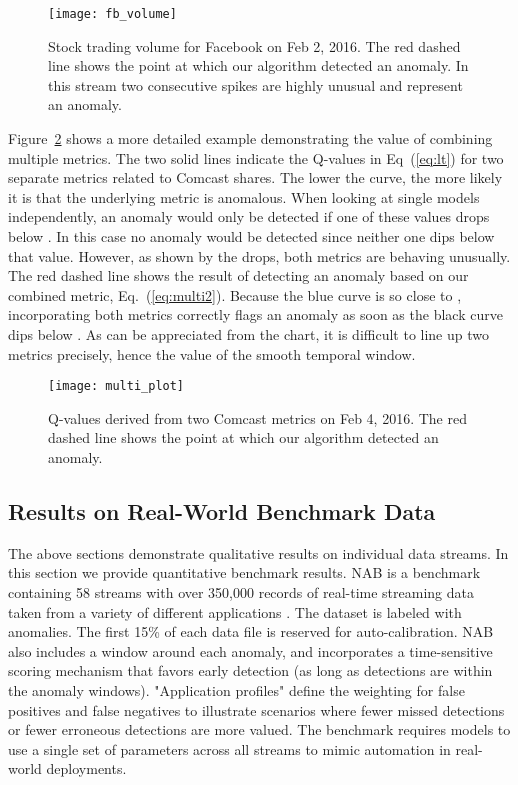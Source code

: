 \documentclass{article}
\begin{document}
\begin{figure}[ht]
\vskip 0.1in
\begin{center}
\centerline{\texttt{[image: fb\_volume]}}
\caption{Stock trading volume for Facebook on Feb 2, 2016. The red dashed line
shows the point at which our algorithm detected an anomaly. In this stream
two consecutive spikes are highly unusual and represent an anomaly.}
\label{fb_volume}
\end{center}
\vskip -0.1in
\end{figure}

Figure~\ref{multi_plot} shows a more detailed example demonstrating the value of
combining multiple metrics.  The two solid lines indicate the Q-values in
Eq~(\ref{eq:lt}) for two separate metrics related to Comcast shares. The lower
the curve, the more likely it is that the underlying metric is anomalous. When
looking at single models independently, an anomaly would only be detected if one
of these values drops below . In this case no anomaly
would be detected since neither one dips below that value. However, as shown by
the drops, both metrics are behaving unusually. The red dashed line shows the
result of detecting an anomaly based on our combined metric,
Eq.~(\ref{eq:multi2}). Because the blue curve is so close to ,
incorporating both metrics correctly flags an anomaly as soon as the black curve
dips below . As can be appreciated from the chart, it is difficult to
line up two metrics precisely, hence the value of the smooth temporal window.

\begin{figure}[ht]
\vskip 0.1in
\begin{center}
\centerline{\texttt{[image: multi\_plot]}}
\caption{Q-values derived from two Comcast metrics on Feb 4, 2016. The red
dashed line shows the point at which our algorithm detected an anomaly.}
\label{multi_plot}
\end{center}
\vskip -0.1in
\end{figure}

\subsection{Results on Real-World Benchmark Data}

The above sections demonstrate qualitative results on individual data streams.
In this section we provide quantitative benchmark results. NAB is a benchmark
containing 58 streams with over 350,000 records of real-time streaming data
taken from a variety of different applications \cite{Lavin2015}. The dataset is
labeled with anomalies. The first 15\% of each data file is reserved for
auto-calibration. NAB also includes a window around each anomaly, and
incorporates a time-sensitive scoring mechanism that favors early detection (as
long as detections are within the anomaly windows). "Application profiles"
define the weighting for false positives and false negatives to illustrate
scenarios where fewer missed detections or fewer erroneous detections are more
valued. The benchmark requires models to use a single set of parameters across
all streams to mimic automation in real-world deployments.
\end{document}
